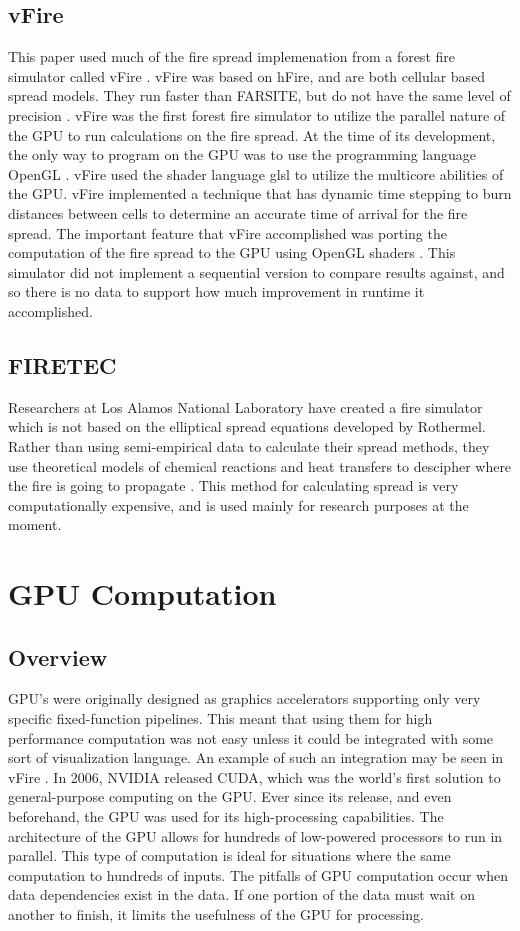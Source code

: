 \subsection{vFire}
This paper used much of the fire spread implemenation from a forest fire simulator called vFire \cite{vFire}. vFire was based on hFire, and are both cellular based spread models. They run faster than FARSITE, but do not have the same level of precision \cite{hFire}. vFire was the first forest fire simulator to utilize the parallel nature of the GPU to run calculations on the fire spread. At the time of its development, the only way to program on the GPU was to use the programming language OpenGL \cite{opengl}. vFire used the shader language glsl to utilize the multicore abilities of the GPU. vFire implemented a technique that has dynamic time stepping to burn distances between cells to determine an accurate time of arrival for the fire spread. The important feature that vFire accomplished was porting the computation of the fire spread to the GPU using OpenGL shaders \cite{opengl}. This simulator did not implement a sequential version to compare results against, and so there is no data to support how much improvement in runtime it accomplished. 

\subsection{FIRETEC}
Researchers at Los Alamos National Laboratory have created a fire simulator which is not based on the elliptical spread equations developed by Rothermel. Rather than using semi-empirical data to calculate their spread methods, they use theoretical models of chemical reactions and heat transfers to descipher where the fire is going to propagate \cite{firetech}. This method for calculating spread is very computationally expensive, and is used mainly for research purposes at the moment. 

\section{GPU Computation}
\subsection{Overview}
GPU's were originally designed as graphics accelerators supporting only very specific fixed-function pipelines. This meant that using them for high performance computation was not easy unless it could be integrated with some sort of visualization language. An example of such an integration may be seen in vFire \cite{vFire}. In 2006, NVIDIA released CUDA, which was the world's first solution to general-purpose computing on the GPU. Ever since its release, and even beforehand, the GPU was used for its high-processing capabilities. The architecture of the GPU allows for hundreds of low-powered processors to run in parallel. This type of computation is ideal for situations where the same computation to hundreds of inputs. The pitfalls of GPU computation occur when data dependencies exist in the data. If one portion of the data must wait on another to finish, it limits the usefulness of the GPU for processing. 

